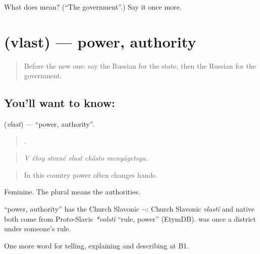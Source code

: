 \begin{tcolorbox}[breakable,colback=teal!4,colframe=teal!35!black,title={Before you move on}]
What does  mean? (\textquotedblleft{}The government\textquotedblright{}.) Say it once more.
\end{tcolorbox}
\section[\texorpdfstring{\ru{власть} (vlast)}{власть (vlast)}]{ (vlast) — power, authority}

\label{lesson:RU-C365-vlast}



\begin{quote}
Before the new one: say the Russian for the state, then the Russian for the government.
\end{quote}

\subsection*{You'll want to know: }
\textbf{} (\emph{vlast}) — \textquotedblleft{}power, authority\textquotedblright{}.

\begin{quote}
     .
\end{quote}

\begin{quote}
\emph{V étoy strané vlast chásto menyáyetsya.}
\end{quote}

\begin{quote}
In this country power often changes hands.
\end{quote}

Feminine. The plural \emph{} means the authorities.

\begin{cousinweb}
\textbf{} \textquotedblleft{}power, authority\textquotedblright{} has the Church Slavonic \emph{--}: Church Slavonic \emph{vlastĭ} and native \emph{} both come from Proto-Slavic \emph{*volstĭ} \textquotedblleft{}rule, power\textquotedblright{} (EtymDB). \emph{} was once a district under someone’s rule.
\end{cousinweb}

\begin{grammarlens}[title={What you've built}]
One more word for telling, explaining and describing at B1.
\end{grammarlens}

